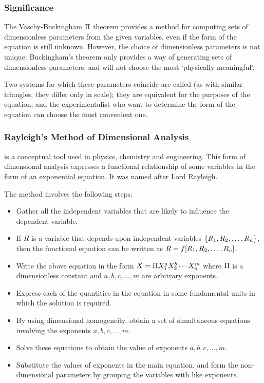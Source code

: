\subsubsection{Significance}
The Vaschy-Buckingham $\Pi$ theorem provides a method for computing sets of dimensionless parameters from the given variables, even if the form of the equation is still unknown. However, the choice of dimensionless parameters is not unique: Buckingham's theorem only provides a way of generating sets of dimensionless parameters, and will not choose the most `physically meaningful'.

Two systems for which these parameters coincide are called  (as with similar triangles, they differ only in scale); they are equivalent for the purposes of the equation, and the experimentalist who want to determine the form of the equation can choose the most convenient one.


\subsubsection{Rayleigh's Method of Dimensional Analysis}
 is a conceptual tool used in physics, chemistry and engineering. This form of dimensional analysis expresses a functional relationship of some variables in the form of an exponential equation. It was named after Lord Rayleigh.

The method involves the following steps:
\begin{itemize}
%
\item Gather all the independent variables that are likely to influence the dependent variable.
%
\item If $R$ is a variable that depends upon independent variables $\left\lbrace{R_1, R_2, \dotsc, R_n}\right\rbrace$, then the functional equation can be written as $R = f\!\left[{R_1, R_2, \dotsc, R_n}\right]$.
%
\item Write the above equation in the form $X = \Pi X_1^a X_2^b \dotsb X_n^m$ where $\Pi$ is a dimensionless constant and $a, b, c, \dotsc, m$ are arbitrary exponents.
%
\item Express each of the quantities in the equation in some fundamental units in which the solution is required.
%
\item By using dimensional homogeneity, obtain a set of simultaneous equations involving the exponents $a, b, c, \dotsc, m$.
%
\item Solve these equations to obtain the value of exponents $a, b, c, \dotsc, m$.
%
\item Substitute the values of exponents in the main equation, and form the non-dimensional parameters by grouping the variables with like exponents.
%
\end{itemize}


